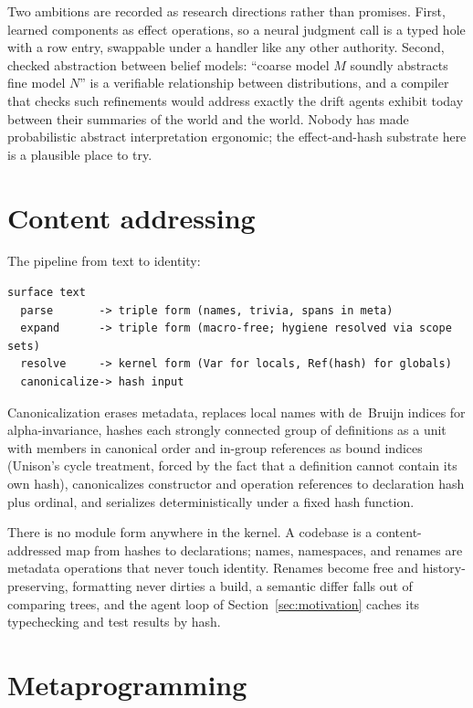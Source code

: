 \documentclass[11pt]{article}
\begin{document}
Two ambitions are recorded as research directions rather than promises. First, learned components as effect operations, so a neural judgment call is a typed hole with a row entry, swappable under a handler like any other authority. Second, checked abstraction between belief models: ``coarse model $M$ soundly abstracts fine model $N$'' is a verifiable relationship between distributions, and a compiler that checks such refinements would address exactly the drift agents exhibit today between their summaries of the world and the world. Nobody has made probabilistic abstract interpretation ergonomic; the effect-and-hash substrate here is a plausible place to try.

\section{Content addressing}
\label{sec:hashing}

The pipeline from text to identity:

\begin{lstlisting}
surface text
  parse       -> triple form (names, trivia, spans in meta)
  expand      -> triple form (macro-free; hygiene resolved via scope sets)
  resolve     -> kernel form (Var for locals, Ref(hash) for globals)
  canonicalize-> hash input
\end{lstlisting}

Canonicalization erases metadata, replaces local names with de~Bruijn indices for alpha-invariance, hashes each strongly connected group of definitions as a unit with members in canonical order and in-group references as bound indices (Unison's cycle treatment, forced by the fact that a definition cannot contain its own hash), canonicalizes constructor and operation references to declaration hash plus ordinal, and serializes deterministically under a fixed hash function.

There is no module form anywhere in the kernel. A codebase is a content-addressed map from hashes to declarations; names, namespaces, and renames are metadata operations that never touch identity. Renames become free and history-preserving, formatting never dirties a build, a semantic differ falls out of comparing trees, and the agent loop of Section~\ref{sec:motivation} caches its typechecking and test results by hash.

\section{Metaprogramming}
\label{sec:meta}
\end{document}
